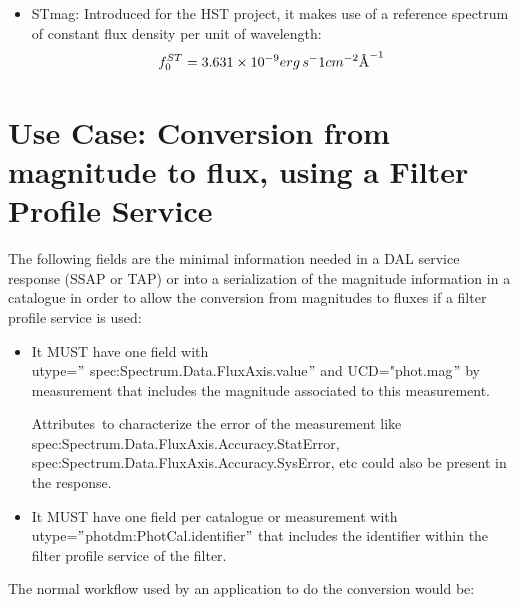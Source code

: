 \documentclass[11pt,a4paper]{ivoa}
\newcommand{\angstrom}{\mbox{\normalfont\AA}}
\begin{document}
\begin{itemize}
	\item{STmag: Introduced for the HST project, it makes use of a reference spectrum of 
	constant flux density per unit of wavelength:
\begin{equation} \label{eq:32}
f_0^{ST} = 3.631 \times 10^{-9} erg\, s^-1 cm^{-2} \angstrom ^{-1}
\end{equation}}

\end{itemize}
\section{Use Case: Conversion from magnitude to flux, using a Filter Profile Service}
The following fields are the minimal information needed in a DAL service response (SSAP 
or TAP) or into a serialization of the magnitude information in a catalogue in order to 
allow the conversion from magnitudes to fluxes if a filter profile service is used:
\par

\begin{itemize}
	\item{It MUST have one field with\\ utype=$"$ spec:Spectrum.Data.FluxAxis.value$"$  
	and UCD="phot.mag$"$  by measurement that includes the magnitude associated to 
	this measurement. \par}

Attributes\ to characterize the error of the measurement like\\  
spec:Spectrum.Data.FluxAxis.Accuracy.StatError,\\ 
spec:Spectrum.Data.FluxAxis.Accuracy.SysError, etc could also be present 
in the response.
\par

	\item{It MUST have one field per catalogue or measurement 
	with\\ utype=$"$photdm:PhotCal.identifier$"$  that includes the identifier within the 
	filter profile service of the filter.}
\end{itemize}\par

The normal workflow used by an application to do the conversion would be:
\par
\end{document}
